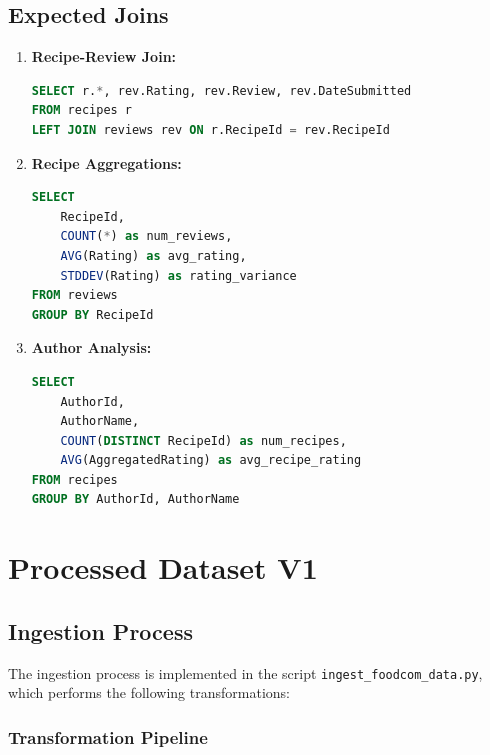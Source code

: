 \documentclass[11pt,a4paper]{article}
\begin{document}
\subsection{Expected Joins}

\begin{enumerate}
    \item \textbf{Recipe-Review Join:}
    \begin{lstlisting}[language=SQL, caption={Main join for interaction analysis}]
SELECT r.*, rev.Rating, rev.Review, rev.DateSubmitted
FROM recipes r
LEFT JOIN reviews rev ON r.RecipeId = rev.RecipeId
    \end{lstlisting}

    \item \textbf{Recipe Aggregations:}
    \begin{lstlisting}[language=SQL, caption={Review metric aggregations}]
SELECT
    RecipeId,
    COUNT(*) as num_reviews,
    AVG(Rating) as avg_rating,
    STDDEV(Rating) as rating_variance
FROM reviews
GROUP BY RecipeId
    \end{lstlisting}

    \item \textbf{Author Analysis:}
    \begin{lstlisting}[language=SQL, caption={Analysis by author}]
SELECT
    AuthorId,
    AuthorName,
    COUNT(DISTINCT RecipeId) as num_recipes,
    AVG(AggregatedRating) as avg_recipe_rating
FROM recipes
GROUP BY AuthorId, AuthorName
    \end{lstlisting}
\end{enumerate}

\section{Processed Dataset V1}

\subsection{Ingestion Process}

The ingestion process is implemented in the script \texttt{ingest\_foodcom\_data.py}, which performs the following transformations:

\subsubsection{Transformation Pipeline}
\end{document}
